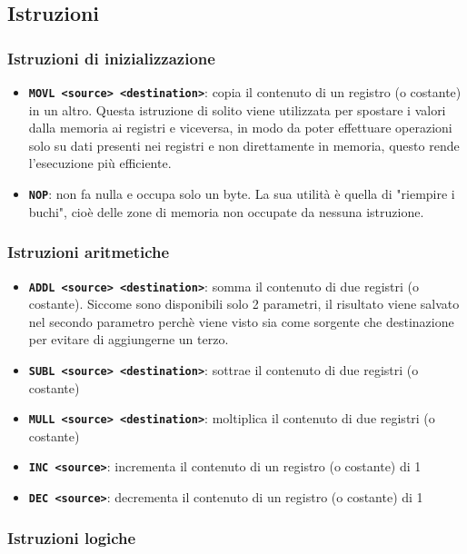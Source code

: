 \documentclass[a4paper]{article}
\theoremstyle{break}
\theoremstyle{break}
\theoremstyle{break}
\theoremstyle{break}
\begin{document}
\subsection{Istruzioni}
\subsubsection{Istruzioni di inizializzazione}
\begin{itemize}
	\item \textbf{\texttt{MOVL <source> <destination>}}: copia il contenuto di un registro (o costante) in un altro.
	      Questa istruzione di solito viene utilizzata per spostare i valori dalla memoria ai
	      registri e viceversa, in modo da poter effettuare operazioni solo su dati presenti
	      nei registri e non direttamente in memoria, questo rende l'esecuzione più efficiente.
	\item \textbf{\texttt{NOP}}: non fa nulla e occupa solo un byte. La sua utilità è quella
	      di "riempire i buchi", cioè delle zone di memoria non occupate da nessuna istruzione.
\end{itemize}

\subsubsection{Istruzioni aritmetiche}
\begin{itemize}
	\item \textbf{\texttt{ADDL <source> <destination>}}: somma il contenuto di due registri (o costante).
	      Siccome sono disponibili solo 2 parametri, il risultato viene salvato nel secondo parametro
	      perchè viene visto sia come sorgente che destinazione per evitare di aggiungerne un terzo.
	\item \textbf{\texttt{SUBL <source> <destination>}}: sottrae il contenuto di due registri (o costante)
	\item \textbf{\texttt{MULL <source> <destination>}}: moltiplica il contenuto di due registri (o costante)
	\item \textbf{\texttt{INC <source>}}: incrementa il contenuto di un registro (o costante) di 1
	\item \textbf{\texttt{DEC <source>}}: decrementa il contenuto di un registro (o costante) di 1
\end{itemize}

\subsubsection{Istruzioni logiche}
\end{document}
